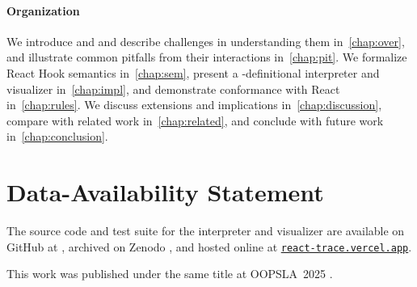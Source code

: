 \paragraph{Organization}
We introduce  and  and describe challenges in understanding them in~\cref{chap:over}, and illustrate common pitfalls from their interactions in~\cref{chap:pit}.
We formalize React Hook semantics in~\cref{chap:sem}, present a \Rtrace-definitional interpreter and visualizer in~\cref{chap:impl}, and demonstrate conformance with React in~\cref{chap:rules}.
We discuss extensions and implications in~\cref{chap:discussion}, compare with related work in~\cref{chap:related}, and conclude with future work in~\cref{chap:conclusion}.


\section*{Data-Availability Statement}
The source code and test suite for the \Rtrace{} interpreter and visualizer are available on GitHub at \href{https://github.com/Zeta611/react-trace}{}, archived on Zenodo \citep{LeeAhn25Zenodo}, and hosted online at \href{https://react-trace.vercel.app/}{\nolinkurl{react-trace.vercel.app}}.

This work was published under the same title at OOPSLA~2025 \citep{LeeAhnYi25React}.
